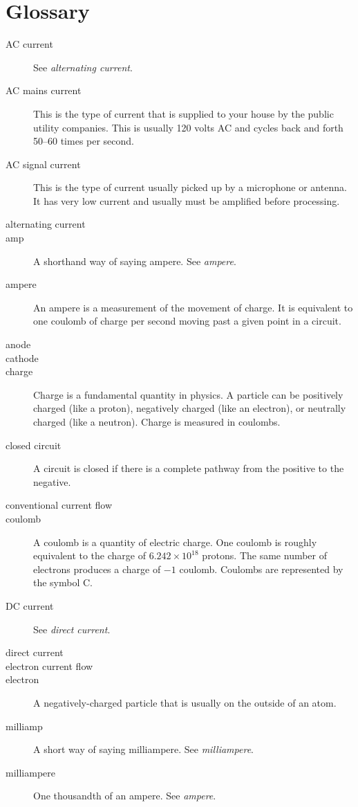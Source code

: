 \chapter{Glossary}
\label{chapGlossary}
\begin{description}
\item[AC current] See \emph{alternating current}.
\item[AC mains current] This is the type of current that is supplied to your house by the public utility companies.  This is usually 120 volts AC and cycles back and forth 50--60 times per second.
\item[AC signal current] This is the type of current usually picked up by a microphone or antenna.  It has very low current and usually must be amplified before processing.
\item[alternating current]
\item[amp] A shorthand way of saying ampere.  See \emph{ampere}.
\item[ampere] An ampere is a measurement of the movement of charge.  It is equivalent to one coulomb of charge per second moving past a given point in a circuit.
\item[anode]
\item[cathode]
\item[charge] Charge is a fundamental quantity in physics.  A particle can be positively charged (like a proton), negatively charged (like an electron), or neutrally charged (like a neutron).  Charge is measured in coulombs.
\item[closed circuit] A circuit is closed if there is a complete pathway from the positive to the negative.
\item[conventional current flow]
\item[coulomb] A coulomb is a quantity of electric charge.  One coulomb is roughly equivalent to the charge of $6.242×10^18$ protons.  The same number of electrons produces a charge of $-1$ coulomb.  Coulombs are represented by the symbol C.
\item[DC current] See \emph{direct current}.
\item[direct current]
\item[electron current flow]
\item[electron] A negatively-charged particle that is usually on the outside of an atom.
\item[milliamp] A short way of saying milliampere.  See \emph{milliampere}.
\item[milliampere] One thousandth of an ampere.  See \emph{ampere}.

\end{description}
